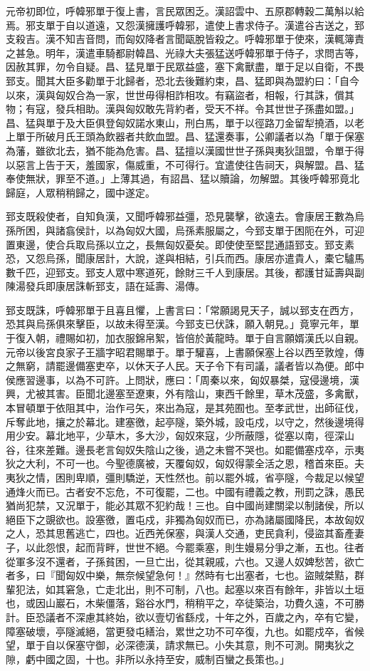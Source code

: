 \begin{pinyinscope}
元帝初即位，呼韓邪單于復上書，言民眾困乏。漢詔雲中、五原郡轉穀二萬斛以給焉。邪支單于自以道遠，又怨漢擁護呼韓邪，遣使上書求侍子。漢遣谷吉送之，郅支殺吉。漢不知吉音問，而匈奴降者言聞甌脫皆殺之。呼韓邪單于使來，漢輒簿責之甚急。明年，漢遣車騎都尉韓昌、光祿大夫張猛送呼韓邪單于侍子，求問吉等，因赦其罪，勿令自疑。昌、猛見單于民眾益盛，塞下禽獸盡，單于足以自衛，不畏郅支。聞其大臣多勸單于北歸者，恐北去後難約束，昌、猛即與為盟約曰：「自今以來，漢與匈奴合為一家，世世毋得相詐相攻。有竊盜者，相報，行其誅，償其物；有寇，發兵相助。漢與匈奴敢先背約者，受天不祥。令其世世子孫盡如盟。」昌、猛與單于及大臣俱登匈奴諾水東山，刑白馬，單于以徑路刀金留犁撓酒，以老上單于所破月氏王頭為飲器者共飲血盟。昌、猛還奏事，公卿議者以為「單于保塞為藩，雖欲北去，猶不能為危害。昌、猛擅以漢國世世子孫與夷狄詛盟，令單于得以惡言上告于天，羞國家，傷威重，不可得行。宜遣使往告祠天，與解盟。昌、猛奉使無狀，罪至不道。」上薄其過，有詔昌、猛以贖論，勿解盟。其後呼韓邪竟北歸庭，人眾稍稍歸之，國中遂定。

郅支既殺使者，自知負漢，又聞呼韓邪益彊，恐見襲擊，欲遠去。會康居王數為烏孫所困，與諸翕侯計，以為匈奴大國，烏孫素服屬之，今郅支單于困阨在外，可迎置東邊，使合兵取烏孫以立之，長無匈奴憂矣。即使使至堅昆通語郅支。郅支素恐，又怨烏孫，聞康居計，大說，遂與相結，引兵而西。康居亦遣貴人，橐它驢馬數千匹，迎郅支。郅支人眾中寒道死，餘財三千人到康居。其後，都護甘延壽與副陳湯發兵即康居誅斬郅支，語在延壽、湯傳。

郅支既誅，呼韓邪單于且喜且懼，上書言曰：「常願謁見天子，誠以郅支在西方，恐其與烏孫俱來擊臣，以故未得至漢。今郅支已伏誅，願入朝見。」竟寧元年，單于復入朝，禮賜如初，加衣服錦帛絮，皆倍於黃龍時。單于自言願婿漢氏以自親。元帝以後宮良家子王牆字昭君賜單于。單于驩喜，上書願保塞上谷以西至敦煌，傳之無窮，請罷邊備塞吏卒，以休天子人民。天子令下有司議，議者皆以為便。郎中侯應習邊事，以為不可許。上問狀，應曰：「周秦以來，匈奴暴桀，寇侵邊境，漢興，尤被其害。臣聞北邊塞至遼東，外有陰山，東西千餘里，草木茂盛，多禽獸，本冒頓單于依阻其中，治作弓矢，來出為寇，是其苑囿也。至孝武世，出師征伐，斥奪此地，攘之於幕北。建塞徼，起亭隧，築外城，設屯戍，以守之，然後邊境得用少安。幕北地平，少草木，多大沙，匈奴來寇，少所蔽隱，從塞以南，徑深山谷，往來差難。邊長老言匈奴失陰山之後，過之未嘗不哭也。如罷備塞戍卒，示夷狄之大利，不可一也。今聖德廣被，天覆匈奴，匈奴得蒙全活之恩，稽首來臣。夫夷狄之情，困則卑順，彊則驕逆，天性然也。前以罷外城，省亭隧，今裁足以候望通烽火而已。古者安不忘危，不可復罷，二也。中國有禮義之教，刑罰之誅，愚民猶尚犯禁，又況單于，能必其眾不犯約哉！三也。自中國尚建關梁以制諸侯，所以絕臣下之覬欲也。設塞徼，置屯戍，非獨為匈奴而已，亦為諸屬國降民，本故匈奴之人，恐其思舊逃亡，四也。近西羌保塞，與漢人交通，吏民貪利，侵盜其畜產妻子，以此怨恨，起而背畔，世世不絕。今罷乘塞，則生嫚易分爭之漸，五也。往者從軍多沒不還者，子孫貧困，一旦亡出，從其親戚，六也。又邊人奴婢愁苦，欲亡者多，曰『聞匈奴中樂，無奈候望急何！』然時有七出塞者，七也。盜賊桀黠，群輩犯法，如其窘急，亡走北出，則不可制，八也。起塞以來百有餘年，非皆以土垣也，或因山巖石，木柴僵落，谿谷水門，稍稍平之，卒徒築治，功費久遠，不可勝計。臣恐議者不深慮其終始，欲以壹切省繇戍，十年之外，百歲之內，卒有它變，障塞破壞，亭隧滅絕，當更發屯繕治，累世之功不可卒復，九也。如罷戍卒，省候望，單于自以保塞守御，必深德漢，請求無已。小失其意，則不可測。開夷狄之隙，虧中國之固，十也。非所以永持至安，威制百蠻之長策也。」


\end{pinyinscope}

